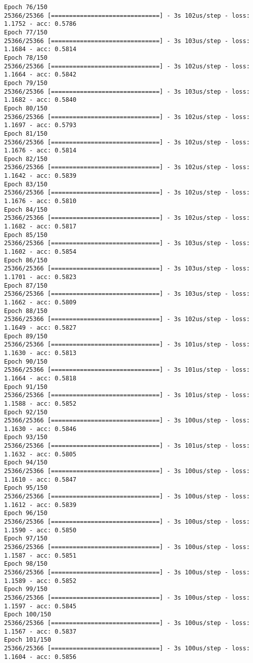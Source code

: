 \documentclass[11pt]{article}
\begin{document}
\begin{Verbatim}[commandchars=\\\{\}]
Epoch 76/150
25366/25366 [==============================] - 3s 102us/step - loss: 1.1752 - acc: 0.5786
Epoch 77/150
25366/25366 [==============================] - 3s 103us/step - loss: 1.1684 - acc: 0.5814
Epoch 78/150
25366/25366 [==============================] - 3s 102us/step - loss: 1.1664 - acc: 0.5842
Epoch 79/150
25366/25366 [==============================] - 3s 103us/step - loss: 1.1682 - acc: 0.5840
Epoch 80/150
25366/25366 [==============================] - 3s 102us/step - loss: 1.1697 - acc: 0.5793
Epoch 81/150
25366/25366 [==============================] - 3s 102us/step - loss: 1.1676 - acc: 0.5814
Epoch 82/150
25366/25366 [==============================] - 3s 102us/step - loss: 1.1642 - acc: 0.5839
Epoch 83/150
25366/25366 [==============================] - 3s 102us/step - loss: 1.1676 - acc: 0.5810
Epoch 84/150
25366/25366 [==============================] - 3s 102us/step - loss: 1.1682 - acc: 0.5817
Epoch 85/150
25366/25366 [==============================] - 3s 103us/step - loss: 1.1602 - acc: 0.5854
Epoch 86/150
25366/25366 [==============================] - 3s 103us/step - loss: 1.1701 - acc: 0.5823
Epoch 87/150
25366/25366 [==============================] - 3s 103us/step - loss: 1.1662 - acc: 0.5809
Epoch 88/150
25366/25366 [==============================] - 3s 102us/step - loss: 1.1649 - acc: 0.5827
Epoch 89/150
25366/25366 [==============================] - 3s 101us/step - loss: 1.1630 - acc: 0.5813
Epoch 90/150
25366/25366 [==============================] - 3s 101us/step - loss: 1.1664 - acc: 0.5818
Epoch 91/150
25366/25366 [==============================] - 3s 101us/step - loss: 1.1588 - acc: 0.5852
Epoch 92/150
25366/25366 [==============================] - 3s 100us/step - loss: 1.1630 - acc: 0.5846
Epoch 93/150
25366/25366 [==============================] - 3s 101us/step - loss: 1.1632 - acc: 0.5805
Epoch 94/150
25366/25366 [==============================] - 3s 100us/step - loss: 1.1610 - acc: 0.5847
Epoch 95/150
25366/25366 [==============================] - 3s 100us/step - loss: 1.1612 - acc: 0.5839
Epoch 96/150
25366/25366 [==============================] - 3s 100us/step - loss: 1.1590 - acc: 0.5850
Epoch 97/150
25366/25366 [==============================] - 3s 100us/step - loss: 1.1587 - acc: 0.5851
Epoch 98/150
25366/25366 [==============================] - 3s 100us/step - loss: 1.1589 - acc: 0.5852
Epoch 99/150
25366/25366 [==============================] - 3s 100us/step - loss: 1.1597 - acc: 0.5845
Epoch 100/150
25366/25366 [==============================] - 3s 100us/step - loss: 1.1567 - acc: 0.5837
Epoch 101/150
25366/25366 [==============================] - 3s 100us/step - loss: 1.1604 - acc: 0.5856

\end{Verbatim}
\end{document}
